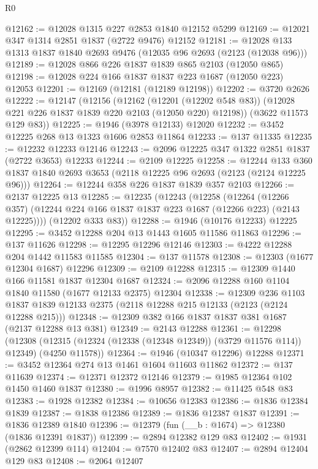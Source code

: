 \begin{lexlean}{R0}
\begin{coremodule}
@12162 := @12028 @1315 @227 @2853 @1840 @12152 @5299
@12169 := @12021 @347 @1314 @2851 @1837 (@2722 @9476) @12152
@12181 := @12028 @133 @1313 @1837 @1840 @2693 @9476 (@12035 @96 @2693 (@2123 (@12038 @96)))
@12189 := @12028 @866 @226 @1837 @1839 @865 @2103 (@12050 @865)
@12198 := @12028 @224 @166 @1837 @1837 @223 @1687 (@12050 @223) @12053
@12201 := @12169 (@12181 (@12189 @12198))
@12202 := @3720 @2626
@12222 := @12147
    (@12156
      (@12162
        (@12201 (@12202 @548 @83))
        (@12028 @221 @226 @1837 @1839 @220 @2103 (@12050 @220) @12198))
      (@3622 @11573 @129 @83))
@12225 := @1946 (@3978 @12133) @12020
@12232 := @3452 @12225 @268 @13 @1323 @1606 @2853 @11864
@12233 := @137 @11335
@12235 := @12232 @12233 @12146
@12243 := @2096 @12225 @347 @1322 @2851 @1837 (@2722 @3653) @12233
@12244 := @2109 @12225
@12258 := @12244
    @133
    @360
    @1837
    @1840
    @2693
    @3653
    (@2118 @12225 @96 @2693 (@2123 (@2124 @12225 @96)))
@12264 := @12244 @358 @226 @1837 @1839 @357 @2103
@12266 := @2137 @12225 @13
@12285 := @12235
    (@12243
      (@12258
        (@12264
          (@12266 @357)
          (@12244 @224 @166 @1837 @1837 @223 @1687 (@12266 @223) (@2143 @12225))))
      (@12202 @333 @83))
@12288 := @1946 (@10176 @12233) @12225
@12295 := @3452 @12288 @204 @13 @1443 @1605 @11586 @11863
@12296 := @137 @11626
@12298 := @12295 @12296 @12146
@12303 := @4222 @12288 @204 @1442 @11583 @11585
@12304 := @137 @11578
@12308 := @12303 (@1677 @12304 @1687) @12296
@12309 := @2109 @12288
@12315 := @12309 @1440 @166 @11581 @1837 @12304 @1687
@12324 := @2096 @12288 @160 @1104 @1840 @11580 (@1677 @12133 @2375) @12304
@12338 := @12309
    @236
    @1103
    @1837
    @1839
    @12133
    @2375
    (@2118 @12288 @215 @12133 (@2123 (@2124 @12288 @215)))
@12348 := @12309 @382 @166 @1837 @1837 @381 @1687 (@2137 @12288 @13 @381)
@12349 := @2143 @12288
@12361 := @12298
    (@12308 (@12315 (@12324 (@12338 (@12348 @12349)) (@3729 @11576 @114)) @12349) (@4250 @11578))
@12364 := @1946 (@10347 @12296) @12288
@12371 := @3452 @12364 @274 @13 @1461 @1604 @11603 @11862
@12372 := @137 @11639
@12374 := @12371 @12372 @12146
@12379 := @1985 @12364 @102 @1450 @1460 @1837
@12380 := @1996 @8957
@12382 := @11425 @548 @83
@12383 := @1928 @12382
@12384 := @10656 @12383
@12386 := @1836 @12384 @1839
@12387 := @1838 @12386
@12389 := @1836 @12387 @1837
@12391 := @1836 @12389 @1840
@12396 := @12379 (fun (__b : @1674) => @12380 (@1836 @12391 @1837))
@12399 := @2894 @12382 @129 @83
@12402 := @1931 (@2862 @12399 @114)
@12404 := @7570 @12402 @83
@12407 := @2894 @12404 @129 @83
@12408 := @2064 @12407

\end{coremodule}
\end{lexlean}

